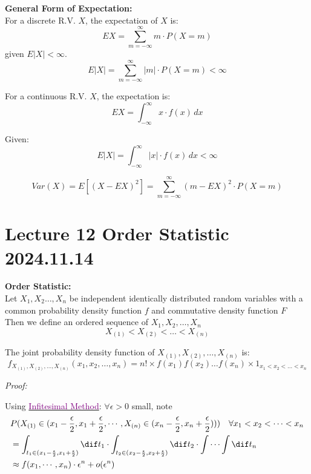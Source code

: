 \documentclass{article}
\begin{document}
\begin{definition}
    \textbf{General Form of Expectation:}\\
    For a discrete R.V. $X$, the expectation of $X$ is:
    \[ EX = \sum_{m=-\infty}^{\infty} m\cdot P(X=m) \]
    given $E|X| < \infty$.
    \[ E|X| = \sum_{m=-\infty}^{\infty} |m|\cdot P(X=m) <\infty \]
    
    For a continuous R.V. $X$, the expectation is:
    \[ EX = \int_{-\infty}^{\infty} x \cdot f(x) \, dx \]
    
    Given:
    \[ E|X| = \int_{-\infty}^{\infty} |x| \cdot f(x) \, dx < \infty \]
    
\end{definition}
\[ Var(X) = E[(X-EX)^{2}] = \sum_{m=-\infty}^{\infty} (m-EX)^{2} \cdot P(X=m) \]








\section{Lecture 12 Order Statistic 2024.11.14}
\begin{definition}
    \textbf{Order Statistic:}\\
    Let $X_1, X_2\dots, X_n$ be independent identically distributed random variables with a common probability density function $f$ and commutative density function $F$\\
    Then we define an ordered sequence of $X_1,X_2,\dots, X_n$
    \begin{equation*}
        X_{(1)} < X_{(2)} < \dots < X_{(n)}
    \end{equation*}
\end{definition}
\begin{theorem}
    The joint probability density function of $X_{(1)}, X_{(2)}, \dots, X_{(n)}$ is:
    \begin{equation*}
        f_{X_{(1)},X_{(2)},\dots,X_{(n)}}(x_1,x_2,\dots,x_n) = n! \times f(x_1)f(x_2)\dots f(x_n) \times 1_{x_1 < x_2 < \dots < x_n}
    \end{equation*}
\end{theorem}
\emph{Proof:}

Using \underline{\textcolor{purple}{Infitesimal Method}}:
$ \forall \epsilon >0 $ 
small, note 
\begin{align*}
    & P(X_{(1)} \in (x_{1} - \frac{\epsilon}{2}, x_{1} + \frac{\epsilon}{2}, \cdots , X_{(n)} \in (x_{n} - \frac{\epsilon}{2}, x_{n} + \frac{\epsilon}{2}))) \quad \forall x_{1} < x_{2} < \cdots < x_{n}\\
    &= \int_{t_{1} \in (x_{1} - \frac{\epsilon}{2}, x_{1} + \frac{\epsilon}{2})} \dif t_{1} \cdot \int_{t_{2} \in (x_{2} - \frac{\epsilon}{2}, x_{2} + \frac{\epsilon}{2})} \dif t_{2} \cdot \int \cdots \int \dif t_{n}\\
    &\approx f(x_{1},\cdots,x_{n}) \cdot \epsilon^{n} + o(\epsilon^{n}) 
\end{align*}
\end{document}
